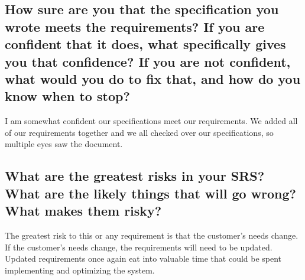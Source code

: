 \documentclass{article}
\begin{document}
    \subsection{How sure are you that the specification you wrote meets the requirements? If you are confident that it does, what specifically gives you that confidence? If you are not confident, what would you do to fix that, and how do you know when to stop?}
 I am somewhat confident our specifications meet our requirements. We added all of our requirements together and we all checked over our specifications, so multiple eyes saw the document.
    \subsection{What are the greatest risks in your SRS? What are the likely things that will go wrong? What makes them risky?}
 The greatest risk to this or any requirement is that the customer's needs change. If the customer's needs change, the requirements will need to be updated. Updated requirements once again eat into valuable time that could be spent implementing and optimizing the system.
\end{document}
